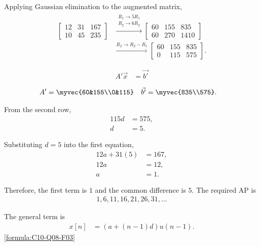 \begin{enumerate}[label=\thesubsection.\arabic*, ref=\thesubsection.\theenumi]
	      Applying Gaussian elimination to the augmented matrix,
	      \begin{align*}
		      \left[\begin{array}{cc|c}
			      12 & 31 & 167 \\
			      10 & 45 & 235
		      \end{array}\right]
		      &\xrightarrow{\substack{R_1\rightarrow5R_1\\R_2\rightarrow6R_2}}
		      \left[\begin{array}{cc|c}
			      60 & 155 & 835 \\
			      60 & 270 & 1410
		      \end{array}\right] \\[6pt]
		      &\xrightarrow{R_2\rightarrow R_2-R_1}
		      \left[\begin{array}{cc|c}
			      60 & 155 & 835 \\
			      0 & 115 & 575
		      \end{array}\right].
	      \end{align*}

	      \begin{align*}
		      A'\vec{x} & =\vec{b'}
	      \end{align*}
	      
	       \begin{align*}
		      A' &= \myvec{60&155\\0&115} &
		       \vec{b'} &= \myvec{835\\575}.
	      \end{align*}

	      From the second row,
	      \begin{align*}
		      115d &=575,\\
		      d &=5.
	      \end{align*}

	      Substituting $d=5$ into the first equation,
	      \begin{align*}
		      12a+31(5) &=167,\\
		      12a &=12,\\
		      a &=1.
	      \end{align*}

	      Therefore, the first term is $1$ and the common difference is $5$.
	      The required AP is
	      \begin{align*}
		      1,6,11,16,21,26,31,\ldots
	      \end{align*}

	      The general term is
		\begin{align*}
			x[n] &= (a+(n-1)d)u(n-1).
		\end{align*}
		\hfill\eqref{formula:C10-Q08-F03}\par


\end{enumerate}
